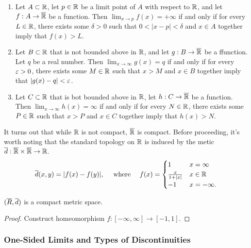 \documentclass[12pt]{article} %
\begin{document}
\begin{proposition}
    \begin{enumerate}
        \item Let $A \subset \mathbb{R}$, let $p \in \mathbb{R}$ be a limit point of $A$ with respect to $\mathbb{R}$, and let $f : A \to \overline{\mathbb{R}}$ be a function. Then $\lim_{x \to p} f(x) = +\infty$ if and only if for every $L \in \mathbb{R}$, there exists some $\delta > 0$ such that $0 < |x-p| < \delta$ and $x \in A$ together imply that $f(x) > L$.
        \item Let $B \subset \mathbb{R}$ that is not bounded above in $\mathbb{R}$, and let $g : B \to \overline{\mathbb{R}}$ be a ffunction. Let $q$ be a real number. Then $\lim_{x \to \infty} g(x) = q$ if and only if for every $\varepsilon > 0$, there exists some $M \in \mathbb{R}$ such that $x > M$ and $x \in B$ together imply that $|g(x) - q| < \varepsilon$.
        \item Let $C \subset \mathbb{R}$ that is bot bounded above in $\mathbb{R}$, let $h : C \to \overline{\mathbb{R}}$ be a function. Then $\lim_{x \to \infty} h(x) = \infty$ if and only if for every $N \in \mathbb{R}$, there exists some $P \in \mathbb{R}$ such that $x > P$ and $x \in C$ together imply that $h(x) > N$.
    \end{enumerate}
\end{proposition}

It turns out that while $\mathbb{R}$ is not compact, $\overline{\mathbb{R}}$ is compact. Before proceeding, it's worth noting that the standard topology on $\mathbb{R}$ is induced by the metic $\overline{d} : \overline{\mathbb{R}} \times \overline{\mathbb{R}} \to \mathbb{R}$.\[\ol{d}(x, y) = |f(x) - f(y)|, \ \ \ \ \text{where} \ \ \ \ f(x) = \begin{cases}
    1 &x = \infty\\
    \frac{x}{1+|x|} &x \in \R\\
    -1 &x = -\infty.
\end{cases}\]

\begin{proposition}
    $(\overline{R}, \overline{d})$ is a compact metric space.
\end{proposition}

\begin{proof}
    Construct homeomorphism $f : [-\infty, \infty] \to [-1,1]$.
\end{proof}

\subsubsection{One-Sided Limits and Types of Discontinuities}
\end{document}
